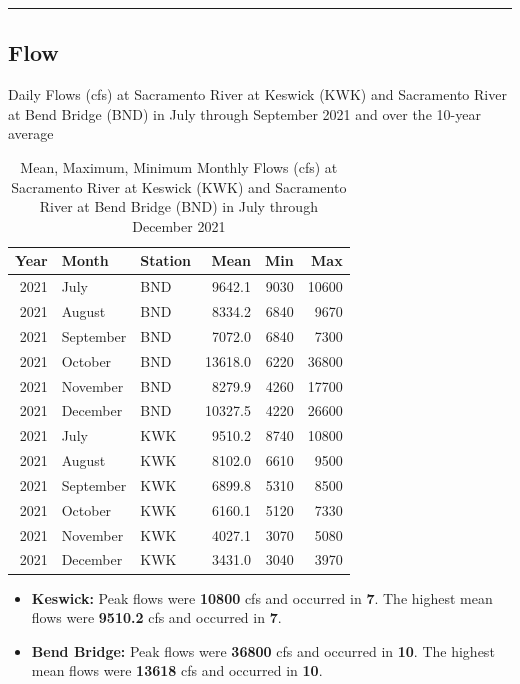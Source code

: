 \documentclass[
]{book}
\providecommand{\tightlist}{%
  \setlength{\itemsep}{0pt}\setlength{\parskip}{0pt}}
\theoremstyle{definition}
\theoremstyle{definition}
\theoremstyle{definition}
\theoremstyle{definition}
\theoremstyle{remark}
\begin{document}
\begin{center}\rule{0.5\linewidth}{0.5pt}\end{center}

\hypertarget{flow}{%
\subsection{Flow}\label{flow}}

\label{fig:KWKBNDflowjuv-fig}Daily Flows (cfs) at Sacramento River at Keswick (KWK) and Sacramento River at Bend Bridge (BND) in July through September 2021 and over the 10-year average

\begin{table}
\centering
\caption{Mean, Maximum, Minimum Monthly Flows (cfs) at Sacramento River at Keswick (KWK) and Sacramento River at Bend Bridge (BND) in July through December 2021}
\centering
\begin{tabular}[t]{rllrrr}
\hline
Year & Month & Station & Mean & Min & Max\\
\hline
2021 & July & BND & 9642.1 & 9030 & 10600\\
\hline
2021 & August & BND & 8334.2 & 6840 & 9670\\
\hline
2021 & September & BND & 7072.0 & 6840 & 7300\\
\hline
2021 & October & BND & 13618.0 & 6220 & 36800\\
\hline
2021 & November & BND & 8279.9 & 4260 & 17700\\
\hline
2021 & December & BND & 10327.5 & 4220 & 26600\\
\hline
2021 & July & KWK & 9510.2 & 8740 & 10800\\
\hline
2021 & August & KWK & 8102.0 & 6610 & 9500\\
\hline
2021 & September & KWK & 6899.8 & 5310 & 8500\\
\hline
2021 & October & KWK & 6160.1 & 5120 & 7330\\
\hline
2021 & November & KWK & 4027.1 & 3070 & 5080\\
\hline
2021 & December & KWK & 3431.0 & 3040 & 3970\\
\hline
\end{tabular}
\end{table}

\begin{itemize}
\tightlist
\item
  \textbf{Keswick:} Peak flows were \textbf{10800} cfs and occurred in \textbf{7}. The highest mean flows were \textbf{9510.2} cfs and occurred in \textbf{7}.
\item
  \textbf{Bend Bridge:} Peak flows were \textbf{36800} cfs and occurred in \textbf{10}. The highest mean flows were \textbf{13618} cfs and occurred in \textbf{10}.
\end{itemize}
\end{document}
